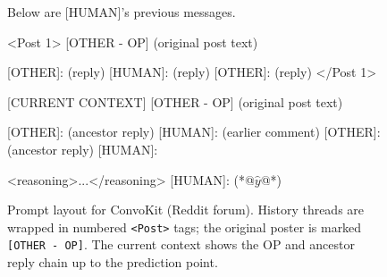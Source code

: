 \begin{figure}[t]
\centering

\begin{promptbox}
Below are [HUMAN]'s previous messages.

<Post 1>
[OTHER - OP]
(original post text)

[OTHER]: (reply)
[HUMAN]: (reply)
[OTHER]: (reply)
</Post 1>

[CURRENT CONTEXT]
[OTHER - OP]
(original post text)

[OTHER]: (ancestor reply)
[HUMAN]: (earlier comment)
[OTHER]: (ancestor reply)
[HUMAN]:
\end{promptbox}

\begin{promptbox}
<reasoning>...</reasoning>
[HUMAN]: (*@$\hat{y}$@*)
\end{promptbox}

\vspace{-6pt}

\caption{Prompt layout for ConvoKit (Reddit forum). History threads are wrapped in numbered \texttt{<Post>} tags; the original poster is marked \texttt{[OTHER - OP]}. The current context shows the OP and ancestor reply chain up to the prediction point.}
\label{fig:convokit_format}
\end{figure}
